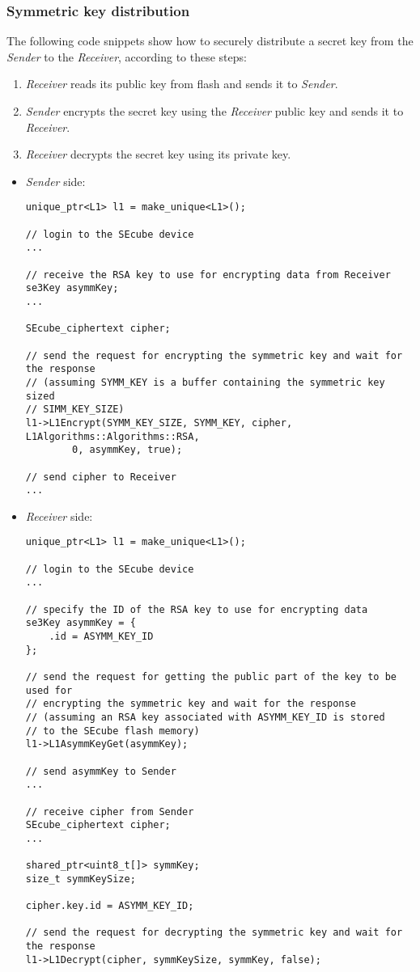 \subsubsection{Symmetric key distribution}
The following code snippets show how to securely distribute a secret key from
the \emph{Sender} to the \emph{Receiver}, according to these steps:
\begin{enumerate}
	\item \emph{Receiver} reads its public key from flash and sends it to
		\emph{Sender}.
	\item \emph{Sender} encrypts the secret key using the \emph{Receiver}
		public key and sends it to \emph{Receiver}.
	\item \emph{Receiver} decrypts the secret key using its private key.
\end{enumerate}

\bigskip
\begin{itemize}
	\item \emph{Sender} side:
\begin{lstlisting}
unique_ptr<L1> l1 = make_unique<L1>();

// login to the SEcube device
...

// receive the RSA key to use for encrypting data from Receiver
se3Key asymmKey;
...

SEcube_ciphertext cipher;

// send the request for encrypting the symmetric key and wait for the response
// (assuming SYMM_KEY is a buffer containing the symmetric key sized
// SIMM_KEY_SIZE)
l1->L1Encrypt(SYMM_KEY_SIZE, SYMM_KEY, cipher, L1Algorithms::Algorithms::RSA,
		0, asymmKey, true);

// send cipher to Receiver
...
\end{lstlisting}
	\item \emph{Receiver} side:
\begin{lstlisting}
unique_ptr<L1> l1 = make_unique<L1>();

// login to the SEcube device
...

// specify the ID of the RSA key to use for encrypting data
se3Key asymmKey = {
	.id = ASYMM_KEY_ID
};

// send the request for getting the public part of the key to be used for
// encrypting the symmetric key and wait for the response
// (assuming an RSA key associated with ASYMM_KEY_ID is stored
// to the SEcube flash memory)
l1->L1AsymmKeyGet(asymmKey);

// send asymmKey to Sender
...

// receive cipher from Sender
SEcube_ciphertext cipher;
...

shared_ptr<uint8_t[]> symmKey;
size_t symmKeySize;

cipher.key.id = ASYMM_KEY_ID;

// send the request for decrypting the symmetric key and wait for the response
l1->L1Decrypt(cipher, symmKeySize, symmKey, false);
\end{lstlisting}
\end{itemize}
